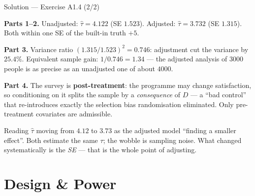\documentclass[aspectratio=169,11pt]{beamer}
\begin{document}
\begin{frame}{Solution --- Exercise A1.4 (2/2)}
\begin{solutionbox}
  \textbf{Parts 1--2.} Unadjusted: $\hat\tau = 4.122$ (SE $1.523$). Adjusted:
  $\hat\tau = 3.732$ (SE $1.315$). Both within one SE of the built-in truth $+5$.

  \smallskip
  \textbf{Part 3.} Variance ratio $(1.315/1.523)^2 = 0.746$: adjustment cut the variance
  by $25.4\%$. Equivalent sample gain: $1/0.746 = 1.34$ --- the adjusted analysis of
  $3000$ people is as precise as an unadjusted one of about $4000$.

  \smallskip
  \textbf{Part 4.} The survey is \textbf{post-treatment}: the programme may change
  satisfaction, so conditioning on it splits the sample by a \emph{consequence} of $D$
  --- a ``bad control'' that re-introduces exactly the selection bias randomisation
  eliminated. Only pre-treatment covariates are admissible.
\end{solutionbox}
\begin{mistake}
  Reading $\hat\tau$ moving from $4.12$ to $3.73$ as the adjusted model ``finding a
  smaller effect''. Both estimate the same $\tau$; the wobble is sampling noise. What
  changed systematically is the \emph{SE} --- that is the whole point of adjusting.
\end{mistake}
\end{frame}

\section{Design \& Power}
\end{document}
